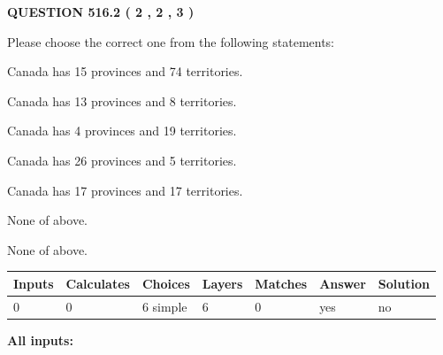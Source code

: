 \documentclass[12pt]{article}
\begin{document}
   
  
\vspace{0.2in}
  
{\textbf{\Large{QUESTION
516.2 
 ( 2 , 2 , 3 )
}}}
  
  
Please choose the correct one from the following statements:
 
 
Canada has  15 provinces and  74 territories.
 
 
Canada has  13 provinces and  8 territories.
 
 
Canada has   4 provinces and  19 territories.
 
 
Canada has  26 provinces and  5 territories.
 
 
Canada has  17 provinces and  17 territories.
 
 
 None of above.
 
 
\noindent{}
 
 
 None of above.
 
 
\noindent{}
 
 
   
   
   
   
\noindent\begin{tabular}{|l|l|l|l|l|l|l|}
 \hline
Inputs & Calculates & Choices & Layers & Matches & Answer & Solution \\ \hline
 0  & 
 0  & 
 6
  simple  
  & 
 6  & 
 0  & 
  yes & 
  no 
  \\ \hline
 \end{tabular}
   
   
   
   
\noindent{}
   
   
   
   
\noindent\vspace{0.1in}\hspace{-0.08in} {\textbf{\Large{All inputs: }}}
   
   
   
   
   
   
 \vspace{0.2in}
 
\end{document}
